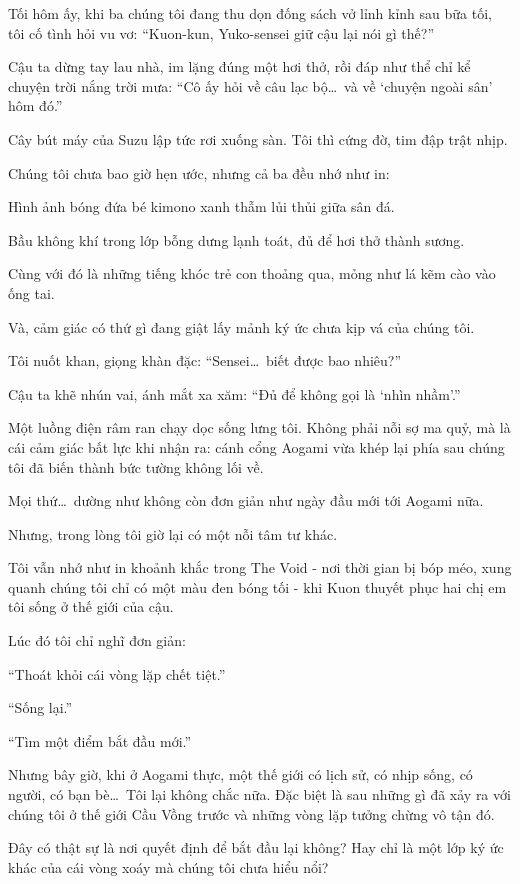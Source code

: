 \documentclass[../main.tex]{subfiles}
\begin{document}
Tối hôm ấy, khi ba chúng tôi đang thu dọn đống sách vở lỉnh kỉnh sau bữa tối, tôi cố tình hỏi vu vơ: ``Kuon-kun, Yuko-sensei giữ cậu lại nói gì thế?''

Cậu ta dừng tay lau nhà, im lặng đúng một hơi thở, rồi đáp như thể chỉ kể chuyện trời nắng trời mưa: ``Cô ấy hỏi về câu lạc bộ\dots\ và về `chuyện ngoài sân' hôm đó.''

Cây bút máy của Suzu lập tức rơi xuống sàn. Tôi thì cứng đờ, tim đập trật nhịp.

Chúng tôi chưa bao giờ hẹn ước, nhưng cả ba đều nhớ như in:

Hình ảnh bóng đứa bé kimono xanh thẫm lủi thủi giữa sân đá.

Bầu không khí trong lớp bỗng dưng lạnh toát, đủ để hơi thở thành sương.

Cùng với đó là những tiếng khóc trẻ con thoảng qua, mỏng như lá kẽm cào vào ống tai.

Và, cảm giác có thứ gì đang giật lấy mảnh ký ức chưa kịp vá của chúng tôi.

Tôi nuốt khan, giọng khàn đặc: ``Sensei\dots\ biết được bao nhiêu?''

Cậu ta khẽ nhún vai, ánh mắt xa xăm: ``Đủ để không gọi là `nhìn nhầm'.''

Một luồng điện râm ran chạy dọc sống lưng tôi. Không phải nỗi sợ ma quỷ, mà là cái cảm giác bất lực khi nhận ra: cánh cổng Aogami vừa khép lại phía sau chúng tôi đã biến thành bức tường không lối về.

Mọi thứ\dots\ dường như không còn đơn giản như ngày đầu mới tới Aogami nữa.

Nhưng, trong lòng tôi giờ lại có một nỗi tâm tư khác.

Tôi vẫn nhớ như in khoảnh khắc trong The Void - nơi thời gian bị bóp méo, xung quanh chúng tôi chỉ có một màu đen bóng tối - khi Kuon thuyết phục hai chị em tôi sống ở thế giới của cậu.

Lúc đó tôi chỉ nghĩ đơn giản:

``Thoát khỏi cái vòng lặp chết tiệt.''

``Sống lại.''

``Tìm một điểm bắt đầu mới.''

Nhưng bây giờ, khi ở Aogami thực, một thế giới có lịch sử, có nhịp sống, có người, có bạn bè\dots\ Tôi lại không chắc nữa. Đặc biệt là sau những gì đã xảy ra với chúng tôi ở thế giới Cầu Vồng trước và những vòng lặp tưởng chừng vô tận đó.

Đây có thật sự là nơi quyết định để bắt đầu lại không? Hay chỉ là một lớp ký ức khác của cái vòng xoáy mà chúng tôi chưa hiểu nổi?
\end{document}
